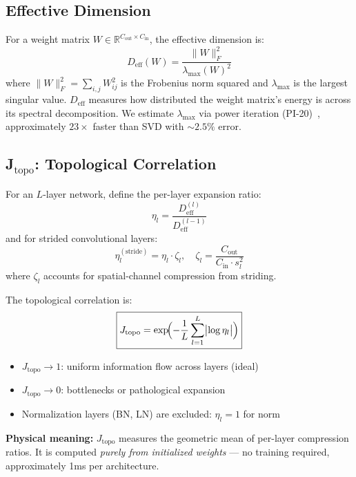 \documentclass[11pt, a4paper]{article}
\theoremstyle{plain}
\begin{document}
\subsection{Effective Dimension}

For a weight matrix $W \in \mathbb{R}^{C_{\mathrm{out}} \times C_{\mathrm{in}}}$, the effective dimension is:
\begin{equation}
D_{\mathrm{eff}}(W) = \frac{\|W\|_F^2}{\lambda_{\max}(W)^2}
\end{equation}
where $\|W\|_F^2 = \sum_{i,j} W_{ij}^2$ is the Frobenius norm squared and $\lambda_{\max}$ is the largest singular value. $D_{\mathrm{eff}}$ measures how distributed the weight matrix's energy is across its spectral decomposition. We estimate $\lambda_{\max}$ via power iteration (PI-20)~\citep{golub2013matrix}, approximately $23\times$ faster than SVD with $\sim 2.5\%$ error.

\subsection{J$_{\mathrm{topo}}$: Topological Correlation}\label{sec:jtopo}

For an $L$-layer network, define the per-layer expansion ratio:
\begin{equation}
\eta_l = \frac{D_{\mathrm{eff}}^{(l)}}{D_{\mathrm{eff}}^{(l-1)}}
\end{equation}
and for strided convolutional layers:
\begin{equation}
\eta_l^{(\mathrm{stride})} = \eta_l \cdot \zeta_l, \quad \zeta_l = \frac{C_{\mathrm{out}}}{C_{\mathrm{in}} \cdot s_l^2}
\end{equation}
where $\zeta_l$ accounts for spatial-channel compression from striding.

The topological correlation is:
\begin{equation}
\boxed{J_{\mathrm{topo}} = \exp\!\Bigl(-\frac{1}{L}\sum_{l=1}^{L}\bigl|\log\eta_l\bigr|\Bigr)}
\end{equation}
\begin{itemize}
\item $J_{\mathrm{topo}} \to 1$: uniform information flow across layers (ideal)
\item $J_{\mathrm{topo}} \to 0$: bottlenecks or pathological expansion
\item Normalization layers (BN, LN) are excluded: $\eta_l = 1$ for norm
\end{itemize}

\textbf{Physical meaning:} $J_{\mathrm{topo}}$ measures the geometric mean of per-layer compression ratios. It is computed \emph{purely from initialized weights} --- no training required, approximately 1ms per architecture.
\end{document}
